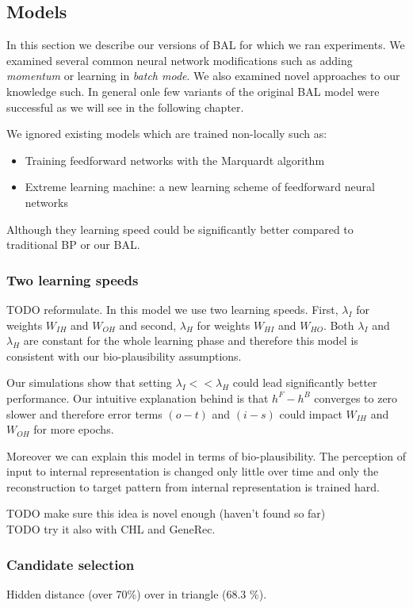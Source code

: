 \subsection{Models}

In this section we describe our versions of BAL for which we ran experiments. We examined several common neural network modifications such as adding \emph{momentum} or learning in \emph{batch mode}. We also examined novel approaches to our knowledge such. In general onle few variants of the original BAL model were successful as we will see in the following chapter. 

We ignored existing models which are trained non-locally such as: 
\begin{itemize} 
\item Training feedforward networks with the Marquardt algorithm
\item Extreme learning machine: a new learning scheme of feedforward neural networks
\end{itemize} 
Although they learning speed could be significantly better compared to traditional BP or our BAL. 

\subsubsection{Two learning speeds} 
TODO reformulate. 
In this model we use two learning speeds. First, $\lambda_I$ for weights $W_{IH}$ and $W_{OH}$ and second, $\lambda_H$ for weights $W_{HI}$ and $W_{HO}$. Both $\lambda_I$ and $\lambda_H$ are constant for the whole learning phase and therefore this model is consistent with our bio-plausibility assumptions. 

Our simulations show that setting $\lambda_I << \lambda_H$ could lead significantly better performance. Our intuitive explanation behind is that $h^F - h^B$ converges to zero slower and therefore error terms $(o - t)$ and $(i - s)$ could impact $W_{IH}$ and $W_{OH}$ for more epochs. 

Moreover we can explain this model in terms of bio-plausibility. The perception of input to internal representation is changed only little over time and only the reconstruction to target pattern from internal representation is trained hard. 

TODO make sure this idea is novel enough (haven't found so far) \\
TODO try it also with CHL and GeneRec.  \\ 

\subsubsection{Candidate selection} 
Hidden distance (over 70\%) over in triangle (68.3 \%). 

